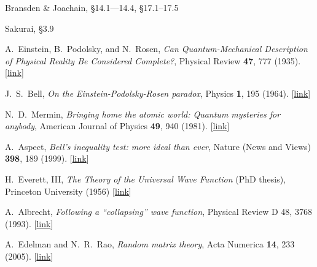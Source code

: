 \documentclass[pra,12pt]{revtex4}
\begin{document}
\begin{enumerate}[[1{]}]
\item Bransden \& Joachain, \S14.1---14.4, \S17.1--17.5

\item Sakurai, \S3.9

\item A.~Einstein, B.~Podolsky, and N.~Rosen,
  \textit{Can Quantum-Mechanical Description of Physical Reality Be
    Considered Complete?}, Physical Review \textbf{47}, 777 (1935).
  [\href{https://journals.aps.org/pr/abstract/10.1103/PhysRev.47.777}{link}]
  \label{cite:epr}

\item J.~S.~Bell, \textit{On the Einstein-Podolsky-Rosen paradox},
  Physics \textbf{1}, 195 (1964). [\href{http://inspirehep.net/record/31657/files/}{link}]\label{cite:bell}
  
\item N.~D.~Mermin, \textit{Bringing home the atomic world: Quantum
  mysteries for anybody}, American Journal of Physics \textbf{49}, 940
  (1981). [\href{http://aapt.scitation.org/doi/abs/10.1119/1.12594}{link}] \label{cite:mermin}

\item A.~Aspect, \textit{Bell's inequality test: more ideal than ever},
  Nature (News and Views) \textbf{398}, 189 (1999). [\href{https://www.nature.com/articles/18296}{link}] \label{cite:aspect}

\item H.~Everett, III, \textit{The Theory of the Universal Wave
  Function} (PhD thesis), Princeton University (1956)
  [\href{http://ucispace.lib.uci.edu/handle/10575/1302}{link}]
\label{cite:everett}

\item A.~Albrecht, \textit{Following a ``collapsing'' wave function},
  Physical Review D \textrm{48}, 3768 (1993). [\href{https://journals.aps.org/prd/abstract/10.1103/PhysRevD.48.3768}{link}]
\label{cite:albrecht}

\item A.~Edelman and N.~R.~Rao, \textit{Random matrix theory}, Acta
  Numerica \textbf{14}, 233 (2005). [\href{https://doi.org/10.1017/S0962492904000236}{link}]
\label{cite:edelman}
\end{enumerate}
\end{document}
